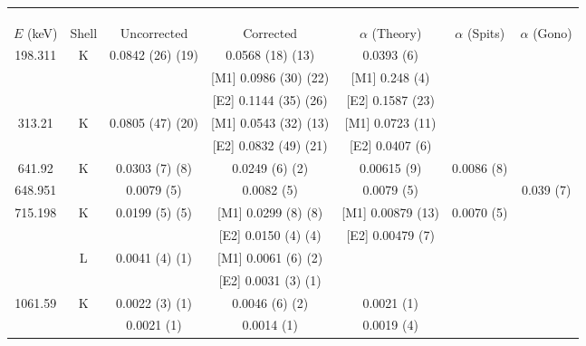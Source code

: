 \begin{landscape}
\begin{table}
    \centering
\begin{ThreePartTable}
\centering
    \begin{tabular}{>{\footnotesize}c|>{\footnotesize}c|>{\footnotesize}c|>{\footnotesize}c|>{\footnotesize}c|>{\footnotesize}c|>{\footnotesize}c}
        \multicolumn{7}{>{\fontsize{12}{15}}c}{TABLE 4.4 (CONTINUED)}\\
        \multicolumn{7}{>{\fontsize{12}{15}}c}{(b)}\\
        \toprule
        &  & \multicolumn{2}{>{\footnotesize}c|}{$\alpha$ (This Work)} & & \\
        $E$ (keV)	& Shell	&	Uncorrected & Corrected &	$\alpha$  (Theory)\citep{kibedi08:_BRICC}	&	$\alpha$ (Spits)\citep{spits96:_154gd} & 	$\alpha$ (Gono)\citep{gono74:_154gd_e0}\\
	    \hline
        198.311	& K &	0.0842	(26) (19)	& 0.0568 (18) (13) & 	0.0393 (6)	&		\\
        &	 & 			&	[M1] 0.0986 (30) (22)	& [M1] 0.248 (4) &\\
        &	&	&		[E2] 0.1144 (35) (26)	& [E2] 0.1587 (23) & \\
	    \hline
        313.21	&	 K	&	0.0805	(47) (20)	 & [M1] 0.0543 (32) (13) &	[M1] 0.0723 (11)	&		\\
        	&	&	&	[E2] 0.0832 (49) (21) &	[E2] 0.0407 (6)	&		\\
        \hline
        641.92	& K &	0.0303 (7) (8)	&	0.0249 (6) (2)	 & 0.00615 (9)  &	0.0086 (8)	\\
        648.951	&		&	0.0079 (5)	&	0.0082 (5) & 0.0079 (5) &  & 0.039 (7)	\\
        \hline
        715.198	& K &	0.0199	(5) (5)	& [M1] 0.0299 (8) (8)	& [M1] 0.00879 (13) 	&	0.0070 (5)	\\
        &				  &	& [E2] 0.0150 (4) (4)	& [E2] 0.00479 (7)		& \\
        &				 L &	0.0041	(4) (1)	&	[M1] 0.0061 (6) (2)	& & 		\\
        &				&				  	&	[E2] 0.0031 (3) (1)	& & 		\\
	    \hline
        1061.59	& K &	0.0022	(3) (1)	&	0.0046 (6) (2) & 0.0021 (1)	&		\\
	    &				&	0.0021 (1) & 0.0014 (1) & 0.0019 (4) &	\\
        \bottomrule
    \end{tabular}

\end{ThreePartTable}
\end{table}
\end{landscape}
